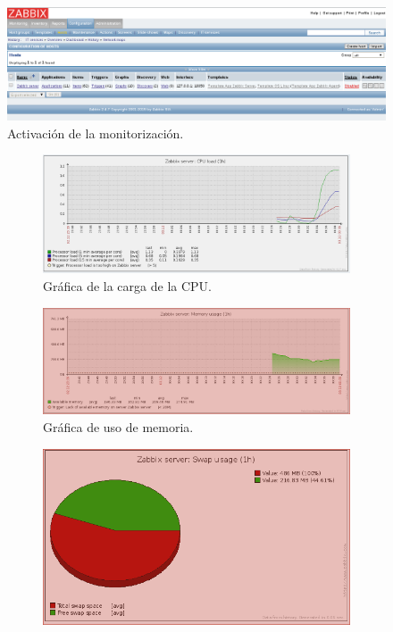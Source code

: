 \begin{figure}[H]
  \begin{center}
    \includegraphics[width=1\textwidth]{imagenes/enable}
    \caption{Activación de la monitorización.}
    \label{fig38}
  \end{center}
\end{figure}


\begin{figure}[H] 
  \begin{subfigure}[b]{0.5\linewidth}
    \centering
    \includegraphics[width=0.95\linewidth]{imagenes/g1} 
    \caption{Gráfica de la carga de la CPU.} 
    \vspace{4ex}
  \end{subfigure}%
  \begin{subfigure}[b]{0.5\linewidth}
    \centering
    \includegraphics[width=0.95\linewidth]{imagenes/g2} 
    \caption{Gráfica de uso de memoria.} 
    \vspace{4ex}
  \end{subfigure} 
  \begin{subfigure}[b]{0.5\linewidth}
    \centering
    \includegraphics[width=0.95\linewidth]{imagenes/g3} 

\end{subfigure}
\end{figure}
